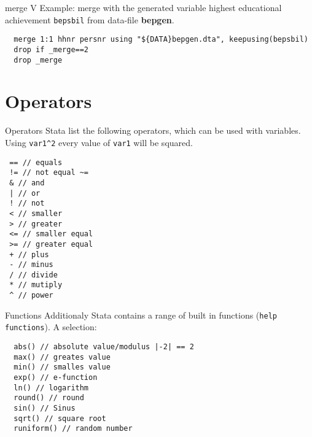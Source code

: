 \begin{frame}[fragile]{merge V}  
Example: merge with the generated variable highest educational achievement \texttt{bepsbil} from data-file \textbf{bepgen}.

\begin{lstlisting}
  merge 1:1 hhnr persnr using "${DATA}bepgen.dta", keepusing(bepsbil)
  drop if _merge==2
  drop _merge
\end{lstlisting}

\end{frame}

\section{Operators}
\begin{frame}[fragile]{Operators} 
Stata list the following operators, which can be used with variables. Using \texttt{var1\^{}2} every value of \texttt{var1} will be squared.
\begin{lstlisting}
 == // equals
 != // not equal ~=
 & // and
 | // or
 ! // not
 < // smaller
 > // greater
 <= // smaller equal
 >= // greater equal
 + // plus
 - // minus
 / // divide
 * // mutiply
 ^ // power
\end{lstlisting}
\end{frame}

\begin{frame}[fragile]{Functions} 
Additionaly Stata contains a range of built in functions (\texttt{help functions}).
A selection:
\begin{lstlisting}
  abs() // absolute value/modulus |-2| == 2
  max() // greates value
  min() // smalles value
  exp() // e-function
  ln() // logarithm
  round() // round
  sin() // Sinus
  sqrt() // square root
  runiform() // random number
\end{lstlisting}
\end{frame}